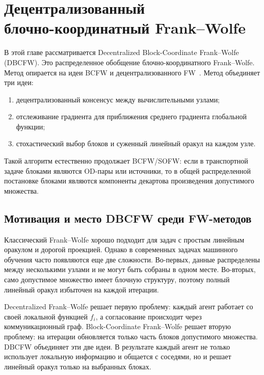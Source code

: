 \newpage

\section[Децентрализованный блочно-координатный Frank--Wolfe]{Децентрализованный\\ блочно-координатный Frank--Wolfe}
\label{sec:dbcfw}

В этой главе рассматривается Decentralized Block-Coordinate Frank--Wolfe (DBCFW).
Это распределенное обобщение блочно-координатного Frank--Wolfe.
Метод опирается на идеи BCFW и децентрализованного FW~\cite{lacoste2013block,wai2017decentralized,vedernikov2023decentralized}.
Метод объединяет три идеи:
\begin{enumerate}
    \item децентрализованный консенсус между вычислительными узлами;
    \item отслеживание градиента для приближения среднего градиента глобальной функции;
    \item стохастический выбор блоков и суженный линейный оракул на каждом узле.
\end{enumerate}
Такой алгоритм естественно продолжает BCFW/SOFW: если в транспортной задаче блоками являются OD-пары или источники, то в общей распределенной постановке блоками являются компоненты декартова произведения допустимого множества.

\subsection{Мотивация и место DBCFW среди FW-методов}

Классический Frank--Wolfe хорошо подходит для задач с простым линейным оракулом и дорогой
проекцией.
Однако в современных задачах машинного обучения часто появляются еще две сложности.
Во-первых, данные распределены между несколькими узлами и не могут быть собраны в одном месте.
Во-вторых, само допустимое множество имеет блочную структуру, поэтому полный линейный оракул
избыточен на каждой итерации.

Decentralized Frank--Wolfe решает первую проблему: каждый агент работает со своей локальной
функцией $f_i$, а согласование происходит через коммуникационный граф.
Block-Coordinate Frank--Wolfe решает вторую проблему: на итерации обновляется только часть
блоков допустимого множества.
DBCFW объединяет эти две идеи.
В результате каждый агент не только использует локальную информацию и общается с соседями,
но и решает линейный оракул только на выбранных блоках.

